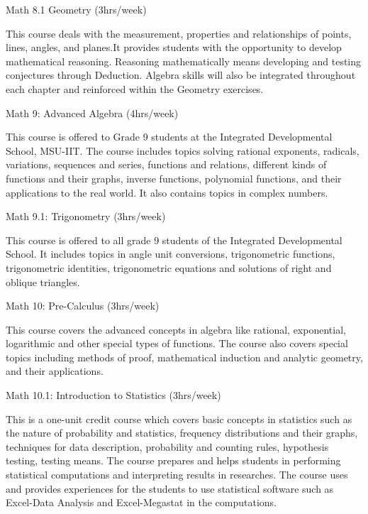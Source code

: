 \begin{subject} Math 8.1 Geometry
	\hfill
	(3hrs/week)
\end{subject}
This course deals with the measurement, properties and relationships of points, lines, angles, and planes.It provides students with the opportunity to develop mathematical reasoning. Reasoning mathematically means developing and testing conjectures through Deduction. Algebra skills will also be integrated throughout each chapter and reinforced within the Geometry exercises.

\begin{subject} Math 9: Advanced Algebra
	\hfill
	(4hrs/week)
\end{subject}
This course is offered to Grade 9 students at the Integrated Developmental School, MSU-IIT. The course includes topics solving rational exponents, radicals, variations, sequences and series, functions and relations, different kinds of functions and their graphs, inverse functions, polynomial functions, and their applications to the real world. It also contains topics in complex numbers.

\begin{subject} Math 9.1: Trigonometry
	\hfill
	(3hrs/week)
\end{subject}
This course is offered to all grade 9 students of the Integrated Developmental School. It includes topics in angle unit conversions, trigonometric functions, trigonometric identities, trigonometric equations and solutions of right and oblique triangles.

\begin{subject} Math 10: Pre-Calculus
	\hfill
	(3hrs/week)
\end{subject}
This course covers the advanced concepts in algebra like rational, exponential, logarithmic and other special types of functions. The course also covers special topics including methods of proof, mathematical induction and analytic geometry, and their applications. 

\begin{subject} Math 10.1: Introduction to Statistics
	\hfill
	(3hrs/week)
\end{subject}
This is a one-unit credit course which covers basic concepts in statistics such as the nature of probability and statistics, frequency distributions and their graphs, techniques for data description, probability and counting rules, hypothesis testing, testing means. The course prepares and helps students in performing statistical computations and interpreting results in researches. The course uses and provides experiences for the students to use statistical software such as Excel-Data Analysis and Excel-Megastat in the computations.

